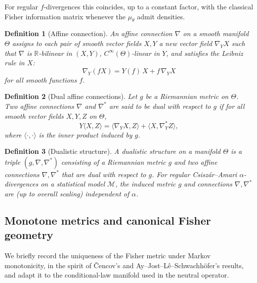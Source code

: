 \documentclass[11pt]{article}
\newtheorem{definition}{Definition}
\newcommand{\Mcal}{\mathcal{M}}
\begin{document}
For regular $f$-divergences this coincides, up to a constant factor, with
the classical Fisher information matrix whenever the $\mu_\theta$ admit
densities.

\begin{definition}[Affine connection]
An \emph{affine connection} $\nabla$ on a smooth manifold $\Theta$ assigns to each
pair of smooth vector fields $X,Y$ a new vector field $\nabla_Y X$ such that
\(\nabla\) is $\mathbb R$-bilinear in $(X,Y)$, $C^\infty(\Theta)$-linear in $Y$, and
satisfies the Leibniz rule in $X$:
\[
  \nabla_Y(fX) = Y(f)\,X + f\,\nabla_Y X
\]
for all smooth functions $f$.
\end{definition}

\begin{definition}[Dual affine connections]
Let $g$ be a Riemannian metric on $\Theta$. Two affine connections $\nabla$ and
$\nabla^\ast$ are said to be \emph{dual with respect to $g$} if for all smooth
vector fields $X,Y,Z$ on $\Theta$,
\[
  Y\langle X,Z\rangle
  = \langle \nabla_Y X, Z\rangle
    + \langle X, \nabla^\ast_Y Z\rangle,
\]
where $\langle\cdot,\cdot\rangle$ is the inner product induced by $g$.
\end{definition}

\begin{definition}[Dualistic structure]
\label{def:fisher-metric-dual}
A \emph{dualistic structure} on a manifold $\Theta$ is a triple
$(g,\nabla,\nabla^\ast)$ consisting of a Riemannian metric $g$ and two
affine connections $\nabla,\nabla^\ast$ that are dual with respect to
$g$. For regular Csiszár--Amari $\alpha$-divergences on a statistical
model $\Mcal$, the induced metric $g$ and connections
$\nabla,\nabla^\ast$ are (up to overall scaling) independent of $\alpha$.
\end{definition}


\subsection{Monotone metrics and canonical Fisher geometry}
\label{subsec:monotone-metrics}

We briefly record the uniqueness of the Fisher metric under Markov
monotonicity, in the spirit of Čencov's and Ay--Jost--Lê--Schwachhöfer's
results, and adapt it to the conditional-law manifold used in the
neutral operator.
\end{document}
